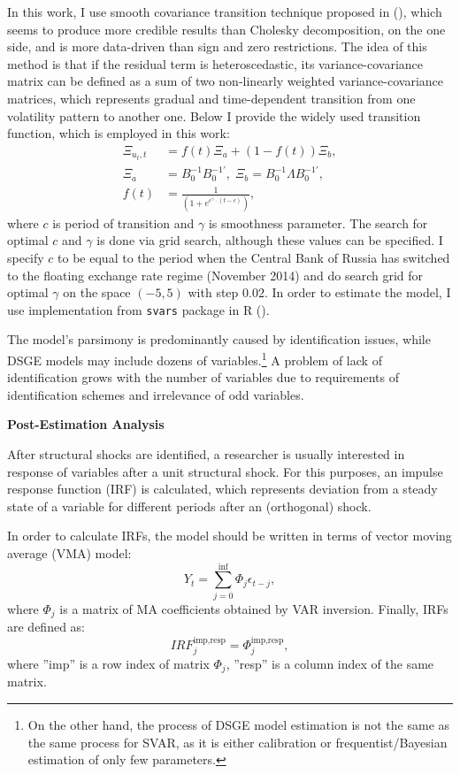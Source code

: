 \documentclass[12pt, a4paper]{extarticle}
\begin{document}
In this work, I use smooth covariance transition technique proposed in (\cite{Luetkepohl2017}), which seems to produce more credible results than Cholesky decomposition, on the one side, and is more data-driven than sign and zero restrictions. The idea of this method is that if the residual term is heteroscedastic, its variance-covariance matrix can be defined as a sum of two non-linearly weighted variance-covariance matrices, which represents gradual and time-dependent transition from one volatility pattern to another one. Below I provide the widely used transition function, which is employed in this work:
\begin{align}
	\Xi_{u_t, t} &= f(t)\Xi_a + (1 - f(t))\Xi_b,\\
	\Xi_a &= B_0^{-1}B_0^{-1'}, \; \Xi_b = B_0^{-1}\Lambda B_0^{-1'},\\
	f(t) &= \frac{1}{(1 + e^{e^\gamma \cdot (t - c)})},
\end{align}
where $c$ is period of transition and $\gamma$ is smoothness parameter. The search for optimal $c$ and $\gamma$ is done via grid search, although these values can be specified. I specify $c$ to be equal to the period when the Central Bank of Russia has switched to the floating exchange rate regime (November 2014) and do search grid for optimal $\gamma$ on the space $(-5,5)$ with step $0.02$. In order to estimate the model, I use implementation from \texttt{svars} package in R (\cite{Lange2021}).

The model's parsimony is predominantly caused by identification issues, while DSGE models may include dozens of variables.\footnote{On the other hand, the process of DSGE model estimation is not the same as the same process for SVAR, as it is either calibration or frequentist/Bayesian estimation of only few parameters.} A problem of lack of identification grows with the number of variables due to requirements of identification schemes and irrelevance of odd variables.

\begin{center}
	\textbf{Post-Estimation Analysis}
\end{center}

After structural shocks are identified, a researcher is usually interested in response of variables after a unit structural shock. For this purposes, an impulse response function (IRF) is calculated, which represents deviation from a steady state of a variable for different periods after an (orthogonal) shock.

In order to calculate IRFs, the model should be written in terms of vector moving average (VMA) model:
\begin{equation}
	Y_t = \sum_{j=0}^{\inf} \Phi_j \epsilon_{t-j},
\end{equation}
where $\Phi_j$ is a matrix of MA coefficients obtained by VAR inversion. Finally, IRFs are defined as:
\begin{equation}
	IRF^{\text{imp,resp}}_j = \Phi_j^{\text{imp,resp}},
\end{equation}
where ''imp'' is a row index of matrix $\Phi_j$, ''resp'' is a column index of the same matrix.
\end{document}
